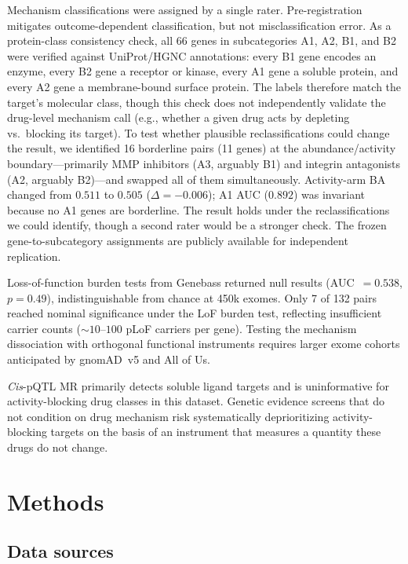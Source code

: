 \documentclass[11pt]{article}
\begin{document}
Mechanism classifications were assigned by a single rater. Pre-registration mitigates outcome-dependent classification, but not misclassification error. As a protein-class consistency check, all 66 genes in subcategories A1, A2, B1, and B2 were verified against UniProt/HGNC annotations: every B1 gene encodes an enzyme, every B2 gene a receptor or kinase, every A1 gene a soluble protein, and every A2 gene a membrane-bound surface protein. The labels therefore match the target's molecular class, though this check does not independently validate the drug-level mechanism call (e.g., whether a given drug acts by depleting vs.\ blocking its target). To test whether plausible reclassifications could change the result, we identified 16 borderline pairs (11 genes) at the abundance/activity boundary---primarily MMP inhibitors (A3, arguably B1) and integrin antagonists (A2, arguably B2)---and swapped all of them simultaneously. Activity-arm BA changed from $0.511$ to $0.505$ ($\Delta = -0.006$); A1 AUC ($0.892$) was invariant because no A1 genes are borderline. The result holds under the reclassifications we could identify, though a second rater would be a stronger check. The frozen gene-to-subcategory assignments are publicly available for independent replication.

Loss-of-function burden tests from Genebass \cite{karczewski2022genebass} returned null results (AUC~$= 0.538$, $p = 0.49$), indistinguishable from chance at 450k exomes. Only 7 of 132 pairs reached nominal significance under the LoF burden test, reflecting insufficient carrier counts (${\sim}10$--$100$ pLoF carriers per gene). Testing the mechanism dissociation with orthogonal functional instruments requires larger exome cohorts anticipated by gnomAD~v5 and All of Us.

\emph{Cis}-pQTL MR primarily detects soluble ligand targets and is uninformative for activity-blocking drug classes in this dataset. Genetic evidence screens that do not condition on drug mechanism risk systematically deprioritizing activity-blocking targets on the basis of an instrument that measures a quantity these drugs do not change.

\section{Methods}
\label{sec:methods}

\subsection{Data sources}
\end{document}

